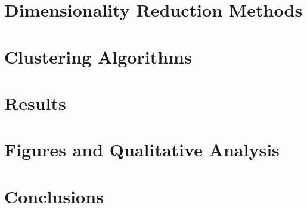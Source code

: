 \documentclass[11pt,a4paper]{article}
\begin{document}
\section{Dimensionality Reduction Methods}


\section{Clustering Algorithms}


\section{Results}


\section{Figures and Qualitative Analysis}


\section{Conclusions}

\end{document}
